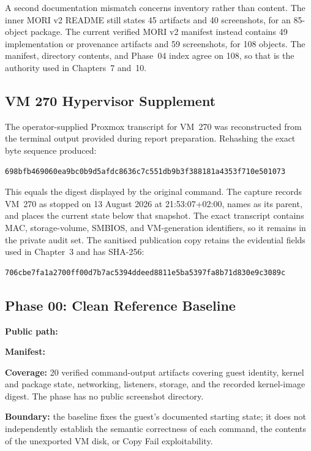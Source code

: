 A second documentation mismatch concerns inventory rather than content. The
inner MORI v2 README still states 45 artifacts and 40 screenshots, for an
85-object package. The current verified MORI v2 manifest instead contains 49
implementation or provenance artifacts and 59 screenshots, for 108 objects.
The manifest, directory contents, and Phase~04 index agree on 108, so that is
the authority used in Chapters~7 and~10.

\subsection{VM 270 Hypervisor Supplement}

The operator-supplied Proxmox transcript for VM~270 was reconstructed from the
terminal output provided during report preparation. Rehashing the exact byte
sequence produced:

\begin{lstlisting}
698bfb469060ea9bc0b9d5afdc8636c7c551db9b3f388181a4353f710e501073
\end{lstlisting}

This equals the digest displayed by the original  command. The
capture records VM~270 as stopped on 13 August 2026 at 21:53:07+02:00, names
 as its parent, and places the current state below that
snapshot. The exact transcript contains MAC, storage-volume, SMBIOS, and
VM-generation identifiers, so it remains in the private audit set. The
sanitised publication copy retains the evidential fields used in Chapter~3 and
has SHA-256:

\begin{lstlisting}
706cbe7fa1a2700ff00d7b7ac5394ddeed8811e5ba5397fa8b71d830e9c3089c
\end{lstlisting}

\subsection{Phase 00: Clean Reference Baseline}
\label{app:evidence-phase00}

\begin{evidencebox}
\textbf{Public path:} 

\textbf{Manifest:} 

\textbf{Coverage:} 20 verified command-output artifacts covering guest
identity, kernel and package state, networking, listeners, storage, and the
recorded kernel-image digest. The phase has no public screenshot directory.

\textbf{Boundary:} the baseline fixes the guest's documented starting state;
it does not independently establish the semantic correctness of each command,
the contents of the unexported VM disk, or Copy Fail exploitability.
\end{evidencebox}

